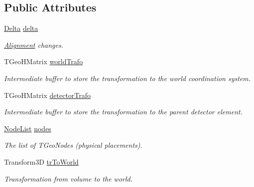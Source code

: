 \subsection*{Public Attributes}
\begin{DoxyCompactItemize}
\item 
\hyperlink{class_d_d4hep_1_1_alignments_1_1_delta}{Delta} \hyperlink{class_d_d4hep_1_1_alignments_1_1_alignment_data_add24423a741867fc3d3954ee65ec3636}{delta}
\begin{DoxyCompactList}\small\item\em \hyperlink{class_d_d4hep_1_1_alignments_1_1_alignment}{Alignment} changes. \item\end{DoxyCompactList}\item 
TGeoHMatrix \hyperlink{class_d_d4hep_1_1_alignments_1_1_alignment_data_a87234aee58d8e087377b029de83ebcd8}{worldTrafo}
\begin{DoxyCompactList}\small\item\em Intermediate buffer to store the transformation to the world coordination system. \item\end{DoxyCompactList}\item 
TGeoHMatrix \hyperlink{class_d_d4hep_1_1_alignments_1_1_alignment_data_a7c01e8657259af3afa97d01c4d7d1733}{detectorTrafo}
\begin{DoxyCompactList}\small\item\em Intermediate buffer to store the transformation to the parent detector element. \item\end{DoxyCompactList}\item 
\hyperlink{class_d_d4hep_1_1_alignments_1_1_alignment_data_a3a667fd798d7523d75accee832d64521}{NodeList} \hyperlink{class_d_d4hep_1_1_alignments_1_1_alignment_data_ae7f0952d17a85f1061aa0b2967aff0ab}{nodes}
\begin{DoxyCompactList}\small\item\em The list of TGeoNodes (physical placements). \item\end{DoxyCompactList}\item 
Transform3D \hyperlink{class_d_d4hep_1_1_alignments_1_1_alignment_data_a468b2dee055c6e6894ae65d37a53712e}{trToWorld}
\begin{DoxyCompactList}\small\item\em Transformation from volume to the world. \item\end{DoxyCompactList}\item 

\end{DoxyCompactItemize}
